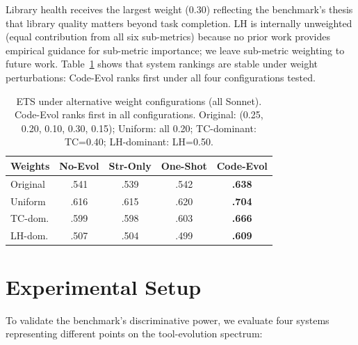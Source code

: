 \documentclass[sigplan,review,anonymous]{acmart}
\begin{document}
Library health receives the largest weight (0.30) reflecting the benchmark's thesis that library quality matters beyond task completion. LH is internally unweighted (equal contribution from all six sub-metrics) because no prior work provides empirical guidance for sub-metric importance; we leave sub-metric weighting to future work. Table~\ref{tab:ets_sensitivity} shows that system rankings are stable under weight perturbations: Code-Evol ranks first under all four configurations tested.

\begin{table}[t]
\centering\footnotesize
\begin{tabular}{lcccc}
\toprule
\textbf{Weights} & \textbf{No-Evol} & \textbf{Str-Only} & \textbf{One-Shot} & \textbf{Code-Evol} \\
\midrule
Original & .541 & .539 & .542 & \textbf{.638} \\
Uniform & .616 & .615 & .620 & \textbf{.704} \\
TC-dom. & .599 & .598 & .603 & \textbf{.666} \\
LH-dom. & .507 & .504 & .499 & \textbf{.609} \\
\bottomrule
\end{tabular}
\caption{ETS under alternative weight configurations (all Sonnet). Code-Evol ranks first in all configurations. Original: (0.25, 0.20, 0.10, 0.30, 0.15); Uniform: all 0.20; TC-dominant: TC=0.40; LH-dominant: LH=0.50.}
\label{tab:ets_sensitivity}
\end{table}

\section{Experimental Setup}

To validate the benchmark's discriminative power, we evaluate four systems representing different points on the tool-evolution spectrum:
\end{document}
